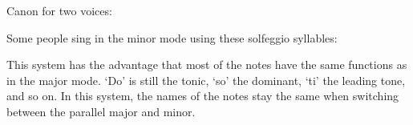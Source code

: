 \documentclass{sight}
\begin{document}
\pagebreak[3]\par
\vspace{5mm}\begin{samepage}Canon for two voices:\\


\pagebreak[3]\par
{}%
\label{tune:169}%
{%
\parindent 0pt
\noindent
\ifx\preLilyPondExample \undefined
\else
  \expandafter\preLilyPondExample
\fi
\def\lilypondbook{}%

\ifx\postLilyPondExample \undefined
\else
  \expandafter\postLilyPondExample
\fi
}
\end{samepage}
\pagebreak[4]\vspace{12mm}
\pagebreak[3]\vspace{12mm}


\pagebreak[3]\par
\vspace{5mm}\begin{samepage}Some people sing in the minor mode using these solfeggio syllables:\\


\pagebreak[3]\par
\par
{%
\parindent 0pt
\noindent
\ifx\preLilyPondExample \undefined
\else
  \expandafter\preLilyPondExample
\fi
\def\lilypondbook{}%

\ifx\postLilyPondExample \undefined
\else
  \expandafter\postLilyPondExample
\fi
}
\end{samepage}


\pagebreak[3]\par
\vspace{5mm}\begin{samepage}This system has the advantage that most of the notes have the same functions as in the major mode. `Do' is still the tonic, `so' the dominant, `ti' the leading tone, and so on. In this system, the names of the notes stay the same when switching between the parallel major and minor.\\
\end{samepage}
\end{document}
